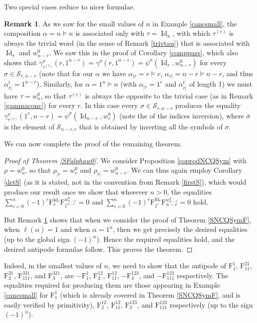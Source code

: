 \documentclass{article}
\theoremstyle{definition}
\newtheorem{rmk}[thm]{Remark}
\begin{document}
Two special cases reduce to nicer formulae.
\begin{rmk}
As we saw for the small values of $n$ in Example \ref{cancsmall}, the composition $\alpha=n \vDash n$ is associated only with $\tau=\operatorname{Id}_{n}$, with which $\tau^{(r)}$ is always the trivial word (in the sense of Remark \ref{trivtau}) that is associated with $\operatorname{Id}_{r}$ and $w^{0}_{n-r}$. We saw this in the proof of Corollary \ref{comppars}, which also shows that $\gamma^{\sigma}_{\tau^{(r)}}(r,1^{n-r})=\gamma^{\sigma}(r,1^{n-r})=\psi^{\sigma}(\operatorname{Id}_{r},w^{0}_{n-r})$ for every $\sigma\in\mathcal{S}_{r,n-r}$ (note that for our $\alpha$ we have $\alpha_{|r}=r \vDash r$, $\alpha_{r|}=n-r \vDash n-r$, and thus $\alpha_{r|}^{t}=1^{n-r}$). Similarly, for $\alpha=1^{n} \vDash n$ (with $\alpha_{|r}=1^{r}$ and $\alpha_{r|}^{t}$ of length 1) we must have $\tau=w^{0}_{n}$, so that $\tau^{(r)}$ is always the opposite to the trivial case (as in Remark \ref{gammaconc}) for every $r$. In this case every $\sigma\in\mathcal{S}_{r,n-r}$ produces the equality $\gamma^{\sigma}_{\tau^{(r)}}(1^{r},n-r)=\psi^{\overline{\sigma}}(\operatorname{Id}_{n-r},w^{0}_{r})$ (note the of the indices inversion), where $\overline{\sigma}$ is the element of $\mathcal{S}_{n-r,r}$ that is obtained by inverting all the symbols of $\sigma$. \label{cancext}
\end{rmk}
We can now complete the proof of the remaining theorem.
\begin{proof}[Proof of Theorem \ref{SFalphaw0}]
We consider Proposition \ref{coprodNCQSym} with $\rho=w^{0}_{n}$, so that $\rho_{|r}=w^{0}_{r}$ and $\rho_{r|}=w^{0}_{n-r}$. We can thus again employ Corollary \ref{detS} (as it is stated, not in the convention from Remark \ref{firstS}), which would produce our result once we show that wherever $n>0$, the equalities $\sum_{r=0}^{n}(-1)^{r}\mathrm{F}_{r}^{\operatorname{Id}_{r}}\mathrm{F}_{1^{n-r}}^{w^{0}_{n-r}}=0$ and $\sum_{r=0}^{n}(-1)^{r}\mathrm{F}_{1^{r}}^{\operatorname{Id}_{r}}\mathrm{F}_{n-r}^{w^{0}_{n-r}}=0$ hold.

But Remark \ref{cancext} shows that when we consider the proof of Theorem \ref{SNCQSymF}, when $\ell(\alpha)=1$ and when $\alpha=1^{n}$, then we get precisely the desired equalities (up to the global sign $(-1)^{n}$). Hence the required equalities hold, and the desired antipode formulae follow. This proves the theorem.
\end{proof}
Indeed, in the smallest values of $n$, we need to show that the antipode of $\mathrm{F}_{1}^{1}$, $\mathrm{F}_{11}^{21}$, $\mathrm{F}_{2}^{21}$, $\mathrm{F}_{111}^{321}$, and $\mathrm{F}_{3}^{321}$, are $-\mathrm{F}_{1}^{1}$, $\mathrm{F}_{2}^{12}$, $\mathrm{F}_{11}^{12}$, $-\mathrm{F}_{3}^{123}$, and $-\mathrm{F}_{111}^{123}$ respectively. The equalities required for producing them are those appearing in Example \ref{cancsmall} for $\mathrm{F}_{1}^{1}$ (which is already covered in Theorem \ref{SNCQSymF}, and is easily verified by primitivity), $\mathrm{F}_{2}^{12}$, $\mathrm{F}_{11}^{12}$, $\mathrm{F}_{3}^{123}$, and $\mathrm{F}_{111}^{123}$ respectively (up to the sign $(-1)^{n}$).
\end{document}

